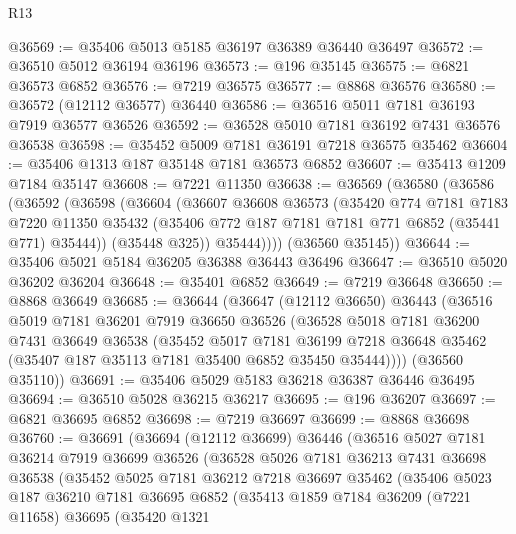 \begin{lexlean}{R13}
\begin{coremodule}
@36569 := @35406 @5013 @5185 @36197 @36389 @36440 @36497
@36572 := @36510 @5012 @36194 @36196
@36573 := @196 @35145
@36575 := @6821 @36573 @6852
@36576 := @7219 @36575
@36577 := @8868 @36576
@36580 := @36572 (@12112 @36577) @36440
@36586 := @36516 @5011 @7181 @36193 @7919 @36577 @36526
@36592 := @36528 @5010 @7181 @36192 @7431 @36576 @36538
@36598 := @35452 @5009 @7181 @36191 @7218 @36575 @35462
@36604 := @35406 @1313 @187 @35148 @7181 @36573 @6852
@36607 := @35413 @1209 @7184 @35147
@36608 := @7221 @11350
@36638 := @36569
    (@36580
      (@36586
        (@36592
          (@36598
            (@36604
              (@36607
                @36608
                @36573
                (@35420
                  @774
                  @7181
                  @7183
                  @7220
                  @11350
                  @35432
                  (@35406 @772 @187 @7181 @7181 @771 @6852 (@35441 @771) @35444))
                (@35448 @325))
              @35444))))
      (@36560 @35145))
@36644 := @35406 @5021 @5184 @36205 @36388 @36443 @36496
@36647 := @36510 @5020 @36202 @36204
@36648 := @35401 @6852
@36649 := @7219 @36648
@36650 := @8868 @36649
@36685 := @36644
    (@36647
      (@12112 @36650)
      @36443
      (@36516
        @5019
        @7181
        @36201
        @7919
        @36650
        @36526
        (@36528
          @5018
          @7181
          @36200
          @7431
          @36649
          @36538
          (@35452
            @5017
            @7181
            @36199
            @7218
            @36648
            @35462
            (@35407 @187 @35113 @7181 @35400 @6852 @35450 @35444))))
      (@36560 @35110))
@36691 := @35406 @5029 @5183 @36218 @36387 @36446 @36495
@36694 := @36510 @5028 @36215 @36217
@36695 := @196 @36207
@36697 := @6821 @36695 @6852
@36698 := @7219 @36697
@36699 := @8868 @36698
@36760 := @36691
    (@36694
      (@12112 @36699)
      @36446
      (@36516
        @5027
        @7181
        @36214
        @7919
        @36699
        @36526
        (@36528
          @5026
          @7181
          @36213
          @7431
          @36698
          @36538
          (@35452
            @5025
            @7181
            @36212
            @7218
            @36697
            @35462
            (@35406
              @5023
              @187
              @36210
              @7181
              @36695
              @6852
              (@35413
                @1859
                @7184
                @36209
                (@7221 @11658)
                @36695
                (@35420
                  @1321

\end{coremodule}
\end{lexlean}
